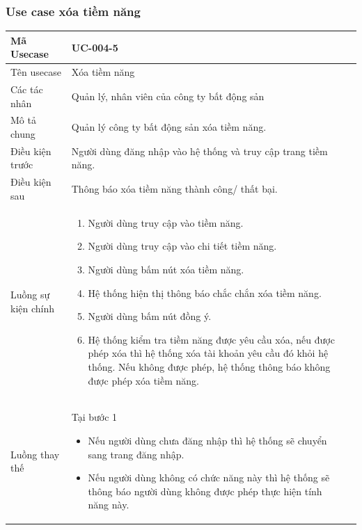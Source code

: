 \documentclass[12pt,a4paper]{article}
\begin{document}
    \subsubsection*{Use case xóa tiềm năng }
    \begin{table}[H]
        \centering
        \begin{tabular}{|p{3.5cm}|p{11.5cm}|c|}
            \hline
            Mã Usecase      & UC-004-5                                                       \\
            \hline
            Tên usecase     & Xóa tiềm năng                                                  \\
            \hline
            Các tác nhân    & Quản lý, nhân viên của công ty bất động sản                    \\
            \hline
            Mô tả chung     & Quản lý công ty bất động sản xóa tiềm năng.                    \\
            \hline
            Điều kiện trước & Người dùng đăng nhập vào hệ thống và truy cập trang tiềm năng. \\
            \hline
            Điều kiện sau   & Thông báo xóa tiềm năng thành công/ thất bại.                  \\
            \hline
            Luồng sự kiện chính & \vspace{-.8cm}\begin{enumerate}
                                                    \item Người dùng truy cập vào tiềm năng.
                                                    \item Người dùng truy cập vào chi tiết tiềm năng.
                                                    \item  Người dùng bấm nút xóa tiềm năng.
                                                    \item  Hệ thống hiện thị thông báo chắc chắn xóa tiềm năng.
                                                    \item  Người dùng bấm nút đồng ý.
                                                    \item Hệ thống kiểm tra tiềm năng được yêu cầu xóa, nếu được phép xóa thì hệ thống xóa tài khoản yêu cầu đó khỏi hệ thống. Nếu không được phép, hệ thống thông báo không được phép xóa tiềm năng.
            \end{enumerate}
            \\
            \hline
            Luồng thay thế & Tại bước 1\newline
            \vspace{-.8cm}\begin{itemize}
                              \item Nếu người dùng chưa đăng nhập thì hệ thống sẽ chuyển sang trang đăng nhập.
                              \item Nếu người dùng không có chức năng này thì hệ thống sẽ thông báo người dùng không được phép thực hiện tính năng này.
            \end{itemize}


\end{tabular}
\end{table}
\end{document}
